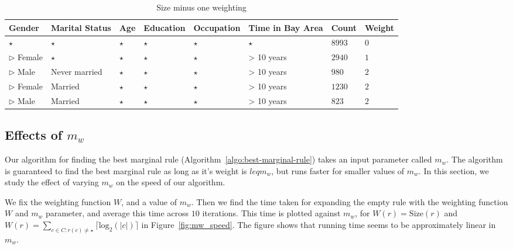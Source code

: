 \documentclass{sig-alternate}
\begin{document}
\begin{table} 
\centering 
\begin{tabular}{| p{1.5cm} | p{1.5cm} | p{1.5cm} | p{1.5cm} | p{1.5cm} | p{1.5cm} | l | l |} 
\hline Gender & Marital Status & Age & Education & Occupation & Time in Bay Area & Count & Weight \\ \hline 
\cline{1-8} $\star$ & $\star$ & $\star$ & $\star$ & $\star$ & $\star$ & $8993$ & $0$ \\
\cline{1-1} \cline{2-2} \cline{3-3} \cline{4-4} \cline{5-5} \cline{6-6} \cline{7-8} $\triangleright$ Female & $\star$ & $\star$ & $\star$ & $\star$ & > 10 years & $2940$ & $1$ \\
\cline{1-1} \cline{2-2} \cline{3-3} \cline{4-4} \cline{5-5} \cline{6-6} \cline{7-8} $\triangleright$ Male & Never married & $\star$ & $\star$ & $\star$ & > 10 years & $980$ & $2$ \\
\cline{1-1} \cline{2-2} \cline{3-3} \cline{4-4} \cline{5-5} \cline{6-6} \cline{7-8} $\triangleright$ Female & Married & $\star$ & $\star$ & $\star$ & > 10 years & $1230$ & $2$ \\
\cline{1-1} \cline{2-2} \cline{3-3} \cline{4-4} \cline{5-5} \cline{6-6} \cline{7-8} $\triangleright$ Male & Married & $\star$ & $\star$ & $\star$ & > 10 years & $823$ & $2$ \\
\hline 
\end{tabular} 
\caption{Size minus one weighting \label{table:weightingsizeminusone}} 
\end{table}  

\subsection{Effects of $m_w$}
Our algorithm for finding the best marginal rule (Algorithm~\ref{algo:best-marginal-rule}) takes an input parameter called $m_w$. The algorithm is guaranteed to find the best marginal rule as long as it's weight is $leq m_w$, but runs faster for smaller values of $m_w$. In this section, we study the effect of varying $m_w$ on the speed of our algorithm.

We fix the weighting function $W$, and a value of $m_w$. Then we find the time taken for expanding the empty rule with the weighting function $W$ and $m_w$ parameter, and average this time across $10$ iterations. This time is plotted against $m_w$, for $W(r) = \text{Size}(r)$ and $W(r) = \sum_{c \in C : r(c) \neq \star} \lceil \text{log}_2(|c|) \rceil$ in Figure~\ref{fig:mw_speed}. The figure shows that running time seems to be approximately linear in $m_w$. 
\end{document}
